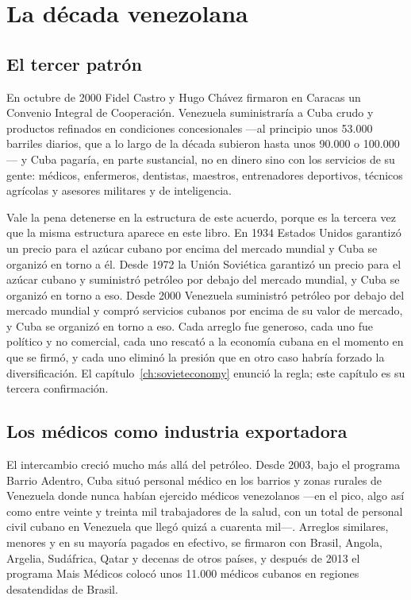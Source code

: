 \chapter{La década venezolana}
\label{ch:venezuela}

\section{El tercer patrón}

En octubre de 2000 Fidel Castro y Hugo Chávez firmaron en Caracas un Convenio
Integral de Cooperación. Venezuela suministraría a Cuba crudo y productos
refinados en condiciones concesionales ---al principio unos 53.000 barriles
diarios, que a lo largo de la década subieron hasta unos 90.000 o 100.000--- y
Cuba pagaría, en parte sustancial, no en dinero sino con los servicios de su
gente: médicos, enfermeros, dentistas, maestros, entrenadores deportivos,
técnicos agrícolas y asesores militares y de inteligencia.\unv{}

Vale la pena detenerse en la estructura de este acuerdo, porque es la tercera vez
que la misma estructura aparece en este libro. En 1934 Estados Unidos garantizó un
precio para el azúcar cubano por encima del mercado mundial y Cuba se organizó en
torno a él. Desde 1972 la Unión Soviética garantizó un precio para el azúcar
cubano y suministró petróleo por debajo del mercado mundial, y Cuba se organizó en
torno a eso. Desde 2000 Venezuela suministró petróleo por debajo del mercado
mundial y compró servicios cubanos por encima de su valor de mercado, y Cuba se
organizó en torno a eso. Cada arreglo fue generoso, cada uno fue político y no
comercial, cada uno rescató a la economía cubana en el momento en que se firmó, y
cada uno eliminó la presión que en otro caso habría forzado la diversificación. El
capítulo~\ref{ch:sovieteconomy} enunció la regla; este capítulo es su tercera
confirmación.

\section{Los médicos como industria exportadora}

El intercambio creció mucho más allá del petróleo. Desde 2003, bajo el programa
Barrio Adentro, Cuba situó personal médico en los barrios y zonas rurales de
Venezuela donde nunca habían ejercido médicos venezolanos ---en el pico, algo así
como entre veinte y treinta mil trabajadores de la salud, con un total de personal
civil cubano en Venezuela que llegó quizá a cuarenta mil---.\unv{} Arreglos
similares, menores y en su mayoría pagados en efectivo, se firmaron con Brasil,
Angola, Argelia, Sudáfrica, Qatar y decenas de otros países, y después de 2013 el
programa Mais Médicos colocó unos 11.000 médicos cubanos en regiones desatendidas
de Brasil.

